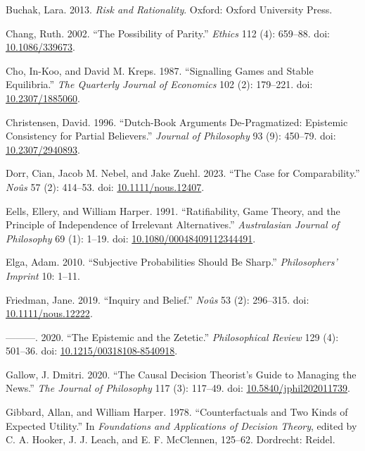 \documentclass[
  10pt,
  letterpaper,
  DIV=11,
  numbers=noendperiod,
  twoside]{scrartcl}
\newlength{\cslhangindent}
\newenvironment{CSLReferences}[2] %
 {\begin{list}{}{%
  \setlength{\itemindent}{0pt}
  \setlength{\leftmargin}{0pt}
  \setlength{\parsep}{0pt}
  \ifodd #1
   \setlength{\leftmargin}{\cslhangindent}
   \setlength{\itemindent}{-1\cslhangindent}
  \fi
  \setlength{\itemsep}{#2\baselineskip}}}
 {\end{list}}
\begin{document}
\begin{CSLReferences}{1}{0}
Buchak, Lara. 2013. \emph{Risk and Rationality}. Oxford: Oxford
University Press.

Chang, Ruth. 2002. {``The Possibility of Parity.''} \emph{Ethics} 112
(4): 659--88. doi:
\href{https://doi.org/10.1086/339673}{10.1086/339673}.

Cho, In-Koo, and David M. Kreps. 1987. {``Signalling Games and Stable
Equilibria.''} \emph{The Quarterly Journal of Economics} 102 (2):
179--221. doi: \href{https://doi.org/10.2307/1885060}{10.2307/1885060}.

Christensen, David. 1996. {``Dutch-Book Arguments {D}e-Pragmatized:
Epistemic Consistency for Partial Believers.''} \emph{Journal of
Philosophy} 93 (9): 450--79. doi:
\href{https://doi.org/10.2307/2940893}{10.2307/2940893}.

Dorr, Cian, Jacob M. Nebel, and Jake Zuehl. 2023. {``The Case for
Comparability.''} \emph{Noûs} 57 (2): 414--53. doi:
\href{https://doi.org/10.1111/nous.12407}{10.1111/nous.12407}.

Eells, Ellery, and William Harper. 1991. {``Ratifiability, Game Theory,
and the Principle of Independence of Irrelevant Alternatives.''}
\emph{Australasian Journal of Philosophy} 69 (1): 1--19. doi:
\href{https://doi.org/10.1080/00048409112344491}{10.1080/00048409112344491}.

Elga, Adam. 2010. {``Subjective Probabilities Should Be Sharp.''}
\emph{Philosophers' Imprint} 10: 1--11.

Friedman, Jane. 2019. {``Inquiry and Belief.''} \emph{No{û}s} 53 (2):
296--315. doi:
\href{https://doi.org/10.1111/nous.12222}{10.1111/nous.12222}.

---------. 2020. {``The Epistemic and the Zetetic.''}
\emph{Philosophical Review} 129 (4): 501--36. doi:
\href{https://doi.org/10.1215/00318108-8540918}{10.1215/00318108-8540918}.

Gallow, J. Dmitri. 2020. {``The Causal Decision Theorist's Guide to
Managing the News.''} \emph{The Journal of Philosophy} 117 (3): 117--49.
doi:
\href{https://doi.org/10.5840/jphil202011739}{10.5840/jphil202011739}.

Gibbard, Allan, and William Harper. 1978. {``Counterfactuals and Two
Kinds of Expected Utility.''} In \emph{Foundations and Applications of
Decision Theory}, edited by C. A. Hooker, J. J. Leach, and E. F.
McClennen, 125--62. Dordrecht: Reidel.


\end{CSLReferences}
\end{document}
